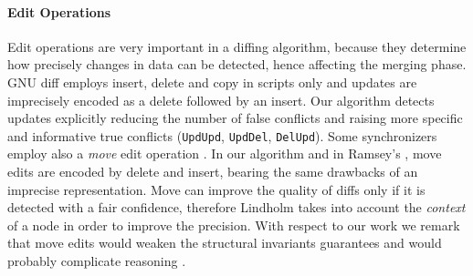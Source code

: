 \documentclass{sigplanconf}
\theoremstyle{plain}
\begin{document}
\paragraph{Edit Operations} 
Edit operations are very important in a diffing algorithm, because
they determine how precisely changes in data can be detected, 
hence affecting the merging phase.
%
GNU diff employs insert, delete and copy in scripts only and updates
are imprecisely encoded as a delete followed by an insert.  Our
algorithm detects updates explicitly reducing the number of false
conflicts and raising more specific and informative true conflicts
(\texttt{UpdUpd}, \texttt{UpdDel}, \texttt{DelUpd}).
%
Some synchronizers employ also a \emph{move} edit operation
\cite{Lind04, Chawathe96, Chawathe97}.
In our algorithm and in Ramsey's \cite{Ramsey01}, move edits
are encoded by delete and insert, bearing the same 
drawbacks of an imprecise representation.
Move can improve the quality of diffs only if it is detected
with a fair confidence, therefore Lindholm takes into
account the \emph{context} of a node in order to improve the precision.
%
With respect to our work we remark that move edits would weaken 
the structural invariants guarantees and would probably 
complicate reasoning \cite{Ramsey01}.
	
\end{document}
